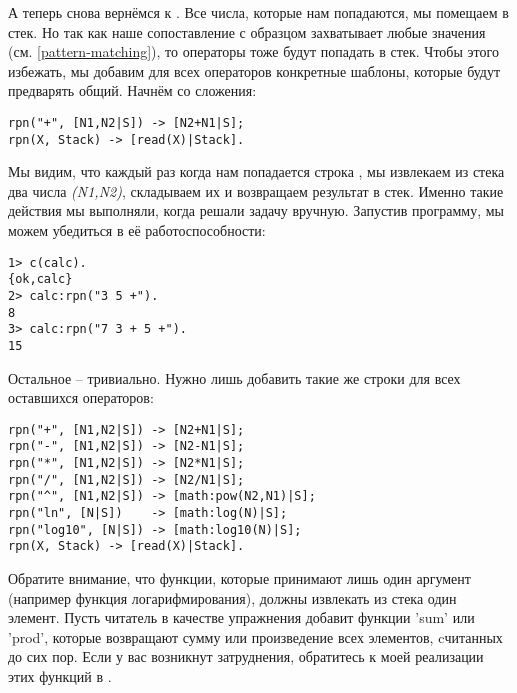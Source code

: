 А теперь снова вернёмся к .
Все числа, которые нам попадаются, мы помещаем в стек.
Но так как наше сопоставление с образцом захватывает любые значения (см. \ref{pattern-matching}), то операторы тоже будут попадать в стек.
Чтобы этого избежать, мы добавим для всех операторов конкретные шаблоны, которые будут предварять общий.
Начнём со сложения:
\begin{lstlisting}[style=erlang]
rpn("+", [N1,N2|S]) -> [N2+N1|S];
rpn(X, Stack) -> [read(X)|Stack].
\end{lstlisting}

Мы видим, что каждый раз когда нам попадается строка , мы извлекаем из стека два числа \emph{(N1,N2)}, складываем их и возвращаем результат в стек.
Именно такие действия мы выполняли, когда решали задачу вручную.
Запустив программу, мы можем убедиться в её работоспособности:
\begin{lstlisting}[style=erlang]
1> c(calc).
{ok,calc}
2> calc:rpn("3 5 +").
8
3> calc:rpn("7 3 + 5 +").
15
\end{lstlisting}

Остальное \--- тривиально.
Нужно  лишь добавить такие же строки для всех оставшихся  операторов:
\begin{lstlisting}[style=erlang]
rpn("+", [N1,N2|S]) -> [N2+N1|S];
rpn("-", [N1,N2|S]) -> [N2-N1|S];
rpn("*", [N1,N2|S]) -> [N2*N1|S];
rpn("/", [N1,N2|S]) -> [N2/N1|S];
rpn("^", [N1,N2|S]) -> [math:pow(N2,N1)|S];
rpn("ln", [N|S])    -> [math:log(N)|S];
rpn("log10", [N|S]) -> [math:log10(N)|S];
rpn(X, Stack) -> [read(X)|Stack].
\end{lstlisting}

Обратите внимание, что функции, которые принимают лишь один аргумент (например функция логарифмирования), должны извлекать из стека один элемент.
Пусть читатель в качестве упражнения добавит функции 'sum' или 'prod', которые возвращают сумму или произведение всех элементов, cчитанных до сих пор.
Если у вас возникнут затруднения, обратитесь к моей реализации этих функций в .

